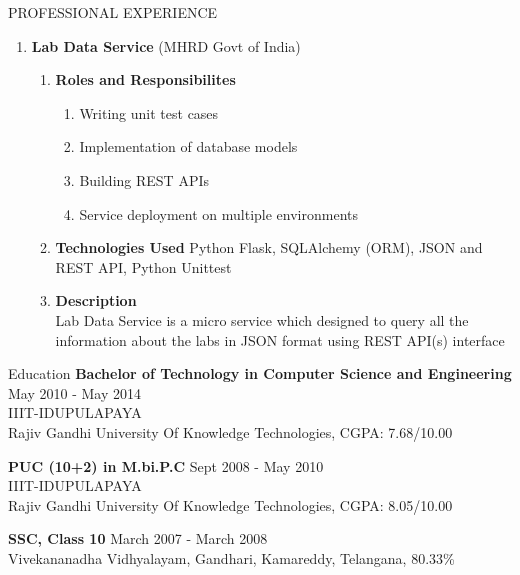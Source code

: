 \documentclass{resume} %
\newcommand{\blank}[1]{\hspace*{#1}}
\begin{document}
\begin{rSection}{PROFESSIONAL EXPERIENCE}
\begin{rSubsection}
\begin{enumerate}[label=\bfseries\arabic*]
\item \textbf {Lab Data Service} (MHRD Govt of India)
  \begin{enumerate}
  \item \textbf{Roles and Responsibilites }
    \begin{enumerate}
    \item Writing  unit test cases
    \item Implementation of database models
    \item Building REST APIs
    \item Service deployment on multiple environments
    \end{enumerate}
  \item \textbf{Technologies Used } Python Flask, SQLAlchemy (ORM),
    JSON and REST API, Python Unittest
  \item \textbf{Description } \\
    \blank{2 cm} Lab Data Service is a micro service which designed to query all the information
    about the labs in JSON format using REST API(s) interface
  \end{enumerate}
\end{enumerate}
\end{rSubsection}

\end{rSection}




\begin{rSection}{Education}
  {\bf Bachelor of Technology in Computer Science and Engineering} \hfill {May 2010 - May 2014}
  \\ 
  IIIT-IDUPULAPAYA
  \\
  Rajiv Gandhi University Of Knowledge Technologies,  CGPA: 7.68/10.00  
  
  {\bf PUC (10+2) in M.bi.P.C} \hfill {Sept 2008 - May 2010}
  \\
  IIIT-IDUPULAPAYA
  \\
  Rajiv Gandhi University Of Knowledge Technologies,  CGPA: 8.05/10.00  
  
  {\textbf{SSC, Class 10}}  \hfill March 2007 - March  2008 \\
  Vivekananadha Vidhyalayam, Gandhari, Kamareddy, Telangana, 80.33\% 

\end{rSection}
\end{document}
